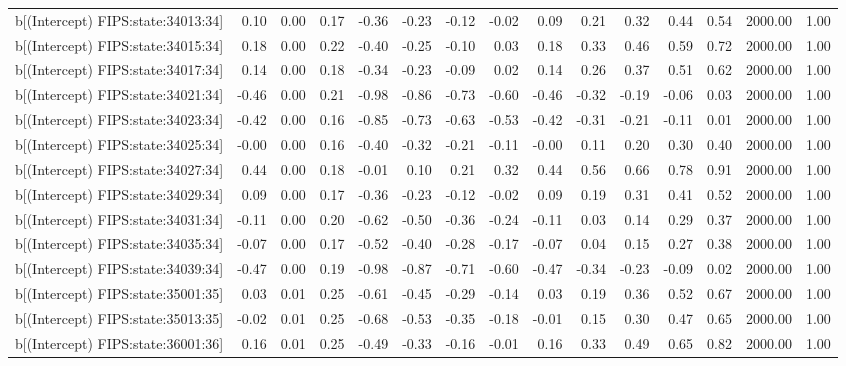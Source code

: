 \begin{table}[ht]
\begin{tabular}{rrrrrrrrrrrrrrr}
  b[(Intercept) FIPS:state:34013:34] & 0.10 & 0.00 & 0.17 & -0.36 & -0.23 & -0.12 & -0.02 & 0.09 & 0.21 & 0.32 & 0.44 & 0.54 & 2000.00 & 1.00 \\ 
  b[(Intercept) FIPS:state:34015:34] & 0.18 & 0.00 & 0.22 & -0.40 & -0.25 & -0.10 & 0.03 & 0.18 & 0.33 & 0.46 & 0.59 & 0.72 & 2000.00 & 1.00 \\ 
  b[(Intercept) FIPS:state:34017:34] & 0.14 & 0.00 & 0.18 & -0.34 & -0.23 & -0.09 & 0.02 & 0.14 & 0.26 & 0.37 & 0.51 & 0.62 & 2000.00 & 1.00 \\ 
  b[(Intercept) FIPS:state:34021:34] & -0.46 & 0.00 & 0.21 & -0.98 & -0.86 & -0.73 & -0.60 & -0.46 & -0.32 & -0.19 & -0.06 & 0.03 & 2000.00 & 1.00 \\ 
  b[(Intercept) FIPS:state:34023:34] & -0.42 & 0.00 & 0.16 & -0.85 & -0.73 & -0.63 & -0.53 & -0.42 & -0.31 & -0.21 & -0.11 & 0.01 & 2000.00 & 1.00 \\ 
  b[(Intercept) FIPS:state:34025:34] & -0.00 & 0.00 & 0.16 & -0.40 & -0.32 & -0.21 & -0.11 & -0.00 & 0.11 & 0.20 & 0.30 & 0.40 & 2000.00 & 1.00 \\ 
  b[(Intercept) FIPS:state:34027:34] & 0.44 & 0.00 & 0.18 & -0.01 & 0.10 & 0.21 & 0.32 & 0.44 & 0.56 & 0.66 & 0.78 & 0.91 & 2000.00 & 1.00 \\ 
  b[(Intercept) FIPS:state:34029:34] & 0.09 & 0.00 & 0.17 & -0.36 & -0.23 & -0.12 & -0.02 & 0.09 & 0.19 & 0.31 & 0.41 & 0.52 & 2000.00 & 1.00 \\ 
  b[(Intercept) FIPS:state:34031:34] & -0.11 & 0.00 & 0.20 & -0.62 & -0.50 & -0.36 & -0.24 & -0.11 & 0.03 & 0.14 & 0.29 & 0.37 & 2000.00 & 1.00 \\ 
  b[(Intercept) FIPS:state:34035:34] & -0.07 & 0.00 & 0.17 & -0.52 & -0.40 & -0.28 & -0.17 & -0.07 & 0.04 & 0.15 & 0.27 & 0.38 & 2000.00 & 1.00 \\ 
  b[(Intercept) FIPS:state:34039:34] & -0.47 & 0.00 & 0.19 & -0.98 & -0.87 & -0.71 & -0.60 & -0.47 & -0.34 & -0.23 & -0.09 & 0.02 & 2000.00 & 1.00 \\ 
  b[(Intercept) FIPS:state:35001:35] & 0.03 & 0.01 & 0.25 & -0.61 & -0.45 & -0.29 & -0.14 & 0.03 & 0.19 & 0.36 & 0.52 & 0.67 & 2000.00 & 1.00 \\ 
  b[(Intercept) FIPS:state:35013:35] & -0.02 & 0.01 & 0.25 & -0.68 & -0.53 & -0.35 & -0.18 & -0.01 & 0.15 & 0.30 & 0.47 & 0.65 & 2000.00 & 1.00 \\ 
  b[(Intercept) FIPS:state:36001:36] & 0.16 & 0.01 & 0.25 & -0.49 & -0.33 & -0.16 & -0.01 & 0.16 & 0.33 & 0.49 & 0.65 & 0.82 & 2000.00 & 1.00 \\ 

\end{tabular}
\end{table}

